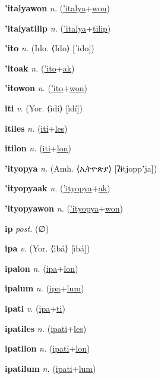 \textbf{\hypertarget{'italyawon}{'italyawon}} \textit{n.} (\hyperlink{'italya}{'italya}+\allowbreak \hyperlink{won}{won})


\textbf{\hypertarget{'italyatilip}{'italyatilip}} \textit{n.} (\hyperlink{'italya}{'italya}+\allowbreak \hyperlink{tilip}{tilip})


\textbf{\hypertarget{'ito}{'ito}} \textit{n.} (Ido. ⟨Ido⟩ [ˈido])


\textbf{\hypertarget{'itoak}{'itoak}} \textit{n.} (\hyperlink{'ito}{'ito}+\allowbreak \hyperlink{ak}{ak})


\textbf{\hypertarget{'itowon}{'itowon}} \textit{n.} (\hyperlink{'ito}{'ito}+\allowbreak \hyperlink{won}{won})


\textbf{\hypertarget{iti}{iti}} \textit{v.} (Yor. ⟨ìdí⟩ [ìdí])


\textbf{\hypertarget{itiles}{itiles}} \textit{n.} (\hyperlink{iti}{iti}+\allowbreak \hyperlink{les}{les})


\textbf{\hypertarget{itilon}{itilon}} \textit{n.} (\hyperlink{iti}{iti}+\allowbreak \hyperlink{lon}{lon})


\textbf{\hypertarget{'ityopya}{'ityopya}} \textit{n.} (Amh. ⟨{\ethiopic{}ኢትዮጵያ}⟩ [ʔɨtjoppʼja])


\textbf{\hypertarget{'ityopyaak}{'ityopyaak}} \textit{n.} (\hyperlink{'ityopya}{'ityopya}+\allowbreak \hyperlink{ak}{ak})


\textbf{\hypertarget{'ityopyawon}{'ityopyawon}} \textit{n.} (\hyperlink{'ityopya}{'ityopya}+\allowbreak \hyperlink{won}{won})


\textbf{\hypertarget{ip}{ip}} \textit{post.} (∅)


\textbf{\hypertarget{ipa}{ipa}} \textit{v.} (Yor. ⟨ìbá⟩ [ìbá])


\textbf{\hypertarget{ipalon}{ipalon}} \textit{n.} (\hyperlink{ipa}{ipa}+\allowbreak \hyperlink{lon}{lon})


\textbf{\hypertarget{ipalum}{ipalum}} \textit{n.} (\hyperlink{ipa}{ipa}+\allowbreak \hyperlink{lum}{lum})


\textbf{\hypertarget{ipati}{ipati}} \textit{v.} (\hyperlink{ipa}{ipa}+\allowbreak \hyperlink{ti}{ti})


\textbf{\hypertarget{ipatiles}{ipatiles}} \textit{n.} (\hyperlink{ipati}{ipati}+\allowbreak \hyperlink{les}{les})


\textbf{\hypertarget{ipatilon}{ipatilon}} \textit{n.} (\hyperlink{ipati}{ipati}+\allowbreak \hyperlink{lon}{lon})


\textbf{\hypertarget{ipatilum}{ipatilum}} \textit{n.} (\hyperlink{ipati}{ipati}+\allowbreak \hyperlink{lum}{lum})


